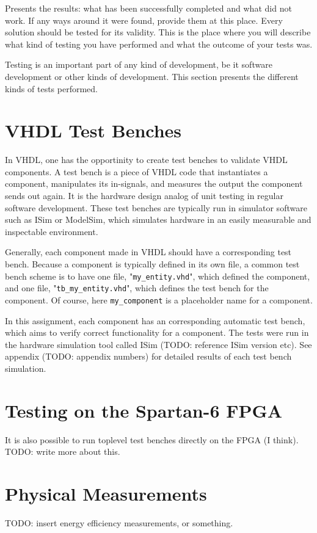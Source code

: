 Presents the results: what has been successfully completed and what did not work.
If any ways around it were found, provide them at this place.
Every solution should be tested for its validity.
This is the place where you will describe what kind of testing you have performed and what the outcome of your tests was.

Testing is an important part of any kind of development, be it software development or other kinds of development.
This section presents the different kinds of tests performed.

\section{VHDL Test Benches}

In VHDL, one has the opportinity to create test benches to validate VHDL components.
A test bench is a piece of VHDL code that instantiates a component, manipulates its in-signals, and measures the output the component sends out again.
It is the hardware design analog of unit testing in regular software development.
These test benches are typically run in simulator software such as ISim or ModelSim, which simulates hardware in an easily measurable and inspectable environment.

Generally, each component made in VHDL should have a corresponding test bench.
Because a component is typically defined in its own file, a common test bench scheme is to have one file, "\texttt{my\_entity.vhd}", which defined the component, and one file, "\texttt{tb\_my\_entity.vhd}", which defines the test bench for the component.
Of course, here \texttt{my\_component} is a placeholder name for a component.

In this assignment, each component has an corresponding automatic test bench, which aims to verify correct functionality for a component.
The tests were run in the hardware simulation tool called ISim (TODO: reference ISim version etc).
See appendix (TODO: appendix numbers) for detailed results of each test bench simulation.

\section{Testing on the Spartan-6 FPGA}

It is also possible to run toplevel test benches directly on the FPGA (I think).
TODO: write more about this.

\section{Physical Measurements}

TODO: insert energy efficiency measurements, or something.
